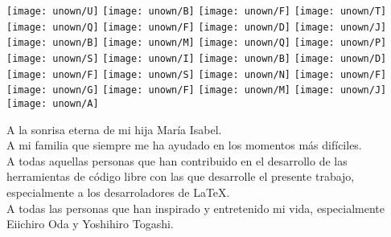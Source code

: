 {\texttt{[image: unown/U]}
\texttt{[image: unown/B]}
\texttt{[image: unown/F]}
\texttt{[image: unown/T]}
\texttt{[image: unown/Q]}
\texttt{[image: unown/F]}
\texttt{[image: unown/D]}
\texttt{[image: unown/J]}
\texttt{[image: unown/B]}
\texttt{[image: unown/M]}
\texttt{[image: unown/Q]}
\texttt{[image: unown/P]}
\texttt{[image: unown/S]}
\texttt{[image: unown/I]}
\texttt{[image: unown/B]}
\texttt{[image: unown/D]}
\texttt{[image: unown/F]}
\texttt{[image: unown/S]}
\texttt{[image: unown/N]}
\texttt{[image: unown/F]}
\texttt{[image: unown/G]}
\texttt{[image: unown/F]}
\texttt{[image: unown/M]}
\texttt{[image: unown/J]}
\texttt{[image: unown/A]}
}

\vspace{5cm}

\begin{flushright}%
\begin{minipage}{0.7\textwidth}%
        \begin{flushright}%
                {\noindent A la sonrisa eterna de mi hija María Isabel.\\
                A mi familia que siempre me ha ayudado en los momentos más difíciles.\\
                A todas aquellas personas que han contribuido en el desarrollo de las herramientas de código 
		libre con las que desarrolle el presente trabajo, especialmente a los desarroladores de 
		\LaTeX.\\
                A todas las personas que han inspirado y entretenido mi vida, especialmente Eiichiro Oda y 
		Yoshihiro Togashi.\\}
        \end{flushright}
\end{minipage}
\end{flushright}

\vspace{3.5cm}
